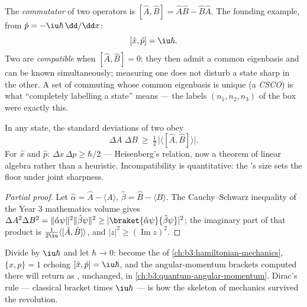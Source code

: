 \begin{definition}\label{def:b3:quantum-formalism:commutator}
The \emph{commutator} of two operators is $[\hat A, \hat B] = \hat
A\hat B - \hat B\hat A$. The founding example, from $\hat p =
-\iu\hbar\,\dd/\dd x$:
\[
[\hat x, \hat p] = \iu\hbar .
\]
Two  are \emph{compatible} when $[\hat A, \hat B] = 0$:
they then admit a common eigenbasis and can be known simultaneously;
measuring one does not disturb a state sharp in the other. A set of
commuting  whose common eigenbasis is unique (a
\emph{CSCO}) is what ``completely labelling a state'' means --- the
labels $(n_1, n_2, n_3)$ of the box were exactly this.
\end{definition}

\begin{theorem}\label{thm:b3:quantum-formalism:uncertainty}
In any state, the standard deviations of two  obey
\[
\Delta A\;\Delta B \ \ge\ \tfrac12\,\big|\langle[\hat A, \hat
B]\rangle\big| .
\]
For $\hat x$ and $\hat p$: $\Delta x\,\Delta p \ge \hbar/2$ ---
Heisenberg's relation, now a theorem of linear algebra rather than a
heuristic. Incompatibility is quantitative: the 's size
sets the floor under joint sharpness.
\end{theorem}

\begin{proof}[Partial proof]
Let $\hat\alpha = \hat A - \langle A\rangle$, $\hat\beta = \hat B -
\langle B\rangle$. The Cauchy--Schwarz inequality of the Year 3
mathematics volume gives $\Delta A^2\Delta B^2 =
\|\hat\alpha\psi\|^2\|\hat\beta\psi\|^2 \ge
|\braket{\hat\alpha\psi}{\hat\beta\psi}|^2$; the imaginary part of
that product is $\tfrac1{2\iu}\langle[\hat A, \hat B]\rangle$, and
$|z|^2 \ge (\operatorname{Im}z)^2$.
\end{proof}

\begin{remark}\label{rem:b3:quantum-formalism:poisson}
Divide by $\iu\hbar$ and let $\hbar \to 0$:  become the
 of \cref{ch:b3:hamiltonian-mechanics}, $\{x, p\} =
1$ echoing $[\hat x, \hat p] = \iu\hbar$, and the angular-momentum
brackets computed there will return as , unchanged, in
\cref{ch:b3:quantum-angular-momentum}. Dirac's rule --- classical
bracket times $\iu\hbar$ --- is how the skeleton of mechanics
survived the revolution.
\end{remark}

